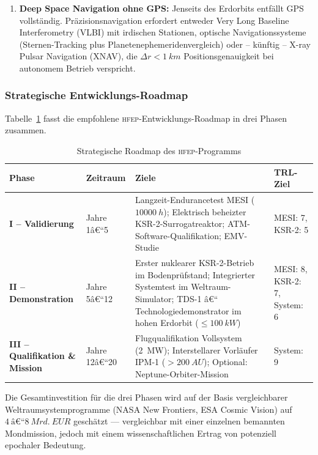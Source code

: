 ﻿\documentclass[a4paper,12pt,twoside]{article}
\theoremstyle{plain}
\theoremstyle{definition}
\theoremstyle{remark}
\newcommand{\HFEP}{\textsc{hfep}}
\begin{document}
\begin{enumerate}
		\item \textbf{Deep Space Navigation ohne GPS:}
		Jenseits des Erdorbits entfällt GPS vollständig. Präzisions\-navigation
		erfordert entweder Very Long Baseline Interferometry (VLBI) mit irdischen
		Stationen, optische Navigationssysteme (Sternen-Tracking plus
		Planetenephemeridenvergleich) oder -- künftig -- X-ray Pulsar Navigation
		(XNAV), die $\Delta r < \SI{1}{km}$ Positionsgenauigkeit bei autonomem
		Betrieb verspricht.
	\end{enumerate}

	\subsubsection{Strategische Entwicklungs-Roadmap}

	Tabelle~\ref{tab:roadmap} fasst die empfohlene \HFEP-Entwicklungs-Roadmap
	in drei Phasen zusammen.

	\begin{table}[H]
		\centering
		\caption{Strategische Roadmap des \HFEP-Programms}
		\label{tab:roadmap}
		\renewcommand{\arraystretch}{1.4}
		\begin{tabular}{p{2.6cm}p{4.2cm}p{4.2cm}p{3.2cm}}
			\toprule
			\textbf{Phase} & \textbf{Zeitraum} & \textbf{Ziele} & \textbf{TRL-Ziel}\\
			\midrule
			\textbf{I -- Validierung} &
			Jahre 1â€“5 &
			Langzeit-Endurancetest MESI ($\SI{10000}{h}$); Elektrisch beheizter
			KSR-2-Surrogatreaktor; ATM-Software-Qualifikation; EMV-Studie &
			MESI: 7, KSR-2: 5\\[4pt]

			\textbf{II -- Demonstration} &
			Jahre 5â€“12 &
			Erster nuklearer KSR-2-Betrieb im Bodenprüfstand; Integrierter
			Systemtest im Weltraum-Simulator; TDS-1 â€“ Technologiedemonstrator
			im hohen Erdorbit ($\leq\SI{100}{kW}$) &
			MESI: 8, KSR-2: 7, System: 6\\[4pt]

			\textbf{III -- Qualifikation \& Mission} &
			Jahre 12â€“20 &
			Flugqualifikation Vollsystem (\SI{2}{MW}); Interstellarer
			Vorläufer IPM-1 ($>\SI{200}{AU}$); Optional:
			Neptune-Orbiter-Mission &
			System: 9\\
			\bottomrule
		\end{tabular}
	\end{table}

	Die Gesamtinvestition für die drei Phasen wird auf der Basis
	vergleichbarer Weltraumsystemprogramme (NASA New Frontiers, ESA
	Cosmic Vision) auf $\SI{4}{â€“}\SI{8}{Mrd.\ EUR}$ geschätzt ---
	vergleichbar mit einer einzelnen bemannten Mondmission, jedoch mit
	einem wissenschaftlichen Ertrag von potenziell epochaler Bedeutung.
\end{document}
